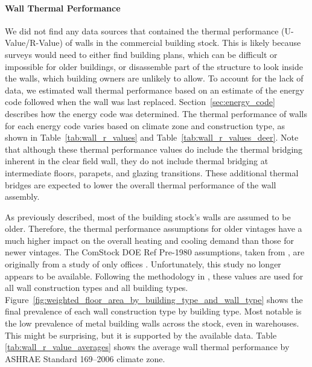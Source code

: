 \paragraph{Wall Thermal Performance}
We did not find any data sources that contained the thermal performance (U-Value/R-Value) of walls in the commercial building stock. This is likely because surveys would need to either find building plans, which can be difficult or impossible for older buildings, or disassemble part of the structure to look inside the walls, which building owners are unlikely to allow. To account for the lack of data, we estimated wall thermal performance based on an estimate of the energy code followed when the wall was last replaced. Section~\ref{sec:energy_code} describes how the energy code was determined. The thermal performance of walls for each energy code varies based on climate zone and construction type, as shown in Table~\ref{tab:wall_r_values} and Table~\ref{tab:wall_r_values_deer}. Note that although these thermal performance values do include the thermal bridging inherent in the clear field wall, they do not include thermal bridging at intermediate floors, parapets, and glazing transitions. These additional thermal bridges are expected to lower the overall thermal performance of the wall assembly.

As previously described, most of the building stock's walls are assumed to be older. Therefore, the thermal performance assumptions for older vintages have a much higher impact on the overall heating and cooling demand than those for newer vintages. The ComStock DOE Ref Pre-1980 assumptions, taken from \cite{doe_reference_buildings}, are originally from a study of only offices \citep{old_vintage_office_study}. Unfortunately, this study no longer appears to be available. Following the methodology in \cite{doe_reference_buildings}, these values are used for all wall construction types and all building types. Figure~\ref{fig:weighted_floor_area_by_building_type_and_wall_type} shows the final prevalence of each wall construction type by building type. Most notable is the low prevalence of metal building walls across the stock, even in warehouses. This might be surprising, but it is supported by the available data. Table \ref{tab:wall_r_value_averages} shows the average wall thermal performance by ASHRAE Standard 169--2006 climate zone.

